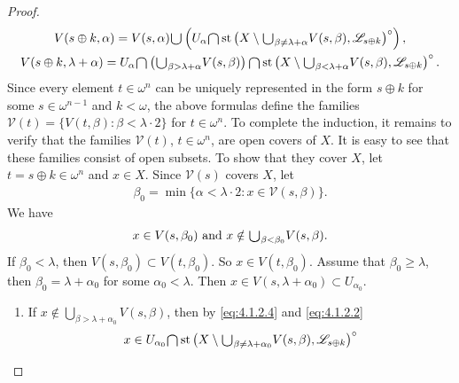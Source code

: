\documentclass[main.tex]{subfiles}
\begin{document}
\begin{proof}
\begin{gather}
V(s \oplus k, \alpha) = V(s, \alpha) \raisebox{-2pt}{\scalebox{1.5}{$\cup$}} \left( U_\alpha \raisebox{-2pt}{\scalebox{1.5}{$\cap$}} 
\operatorname{st}\left( X \setminus \raisebox{-2pt}{\scalebox{1.5}{$\cup$}}_{\beta \ne\lambda+ \alpha} V(s, \beta), 
\mathscr{L}_{s \oplus k} \right)^\circ \right),      \label{eq:4.1.2.2} \\
V(s \oplus k, \lambda + \alpha) = U_\alpha \raisebox{-2pt}{\scalebox{1.5}{$\cap$}} 
\left( \raisebox{-2pt}{\scalebox{1.5}{$\cup$}}_{\beta > \lambda + \alpha} V(s, \beta) \right) 
\raisebox{-2pt}{\scalebox{1.5}{$\cap$}} \operatorname{st}\left( X \setminus \raisebox{-2pt}{\scalebox{1.5}{$\cup$}}_{\beta < \lambda + \alpha} V(s, \beta), 
\mathscr{L}_{s \oplus k} \right)^\circ.   \label{eq:4.1.2.3}
\end{gather}
Since every element $t \in \omega^n$ can be uniquely represented in the form $s \oplus k$ 
for some $s\in \omega^{n-1}$ and $k < \omega$, 
the above formulas define the families $\mathscr{V}(t) = \{V(t, \beta): \beta < \lambda \cdot 2\}$ 
for $t \in \omega^n$. To complete the induction, it remains to verify that the families 
$\mathscr{V}(t)$, $t \in \omega^n$, are open covers of $X$.
It is easy to see that these families consist of open subsets. 
To show that they cover $X$, let $t = s \oplus k \in \omega^n$ and  $x \in X$.
Since $\mathscr{V}(s)$ covers $X$, let 
\begin{gather*}
	\beta_0 = \min \{ \alpha < \lambda \cdot 2: x \in \mathscr{V}(s, \beta) \}.
\end{gather*}
We have
\begin{equation}
x \in V(s, \beta_0)  \textup{ and }
x \notin \raisebox{-2pt}{\scalebox{1.5}{$\cup$}}_{\beta < \beta_{0}} V(s, \beta).   \label{eq:4.1.2.4}
\end{equation}
If $\beta_0 < \lambda$, then $V(s, \beta_0)\subset V(t, \beta_0)$. 
So $x \in V(t, \beta_0)$.
Assume that $\beta_{0} \ge \lambda$, then $\beta_{0} = \lambda + \alpha_{0}$ 
for some $\alpha_0 < \lambda$. Then $x \in V(s, \lambda + \alpha_0) \subset U_{\alpha_0}.$
\begin{enumerate}
\item[(a)] If $x \notin \bigcup_{\beta > \lambda + \alpha_{0}} V(s, \beta)$, 
	then by \eqref{eq:4.1.2.4} and \eqref{eq:4.1.2.2}
	$$x \in U_{\alpha_{0}} \raisebox{-2pt}{\scalebox{1.5}{$\cap$}} \operatorname{st}\left(X\setminus 
	\raisebox{-2pt}{\scalebox{1.5}{$\cup$}}_{\beta \ne \lambda + \alpha_{0}} V(s, \beta), 
	\mathscr{L}_{s \oplus k}\right)^{\circ} 
$$
\end{enumerate}
\end{proof}
\end{document}
